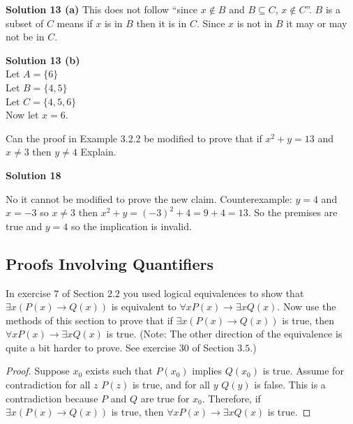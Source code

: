 \textbf{Solution 13 (a)}
This does not follow ``since $x \not\in B$ and $B \subseteq C$, $x \not\in C$''.
$B$ is a subset of $C$ means if $x$ is in $B$ then it is in $C$. 
Since $x$ is not in $B$ it may or may not be in $C$.

\textbf{Solution 13 (b)} \\
Let $A = \{6\}$ \\
Let $B = \{4, 5\}$ \\
Let $C = \{4, 5, 6\}$ \\
Now let $x = 6$. 

\begin{tcolorbox}[title=Problem 18, breakable]
    Can the proof in Example 3.2.2 be modified to
    prove that if $x^2 + y = 13$ and $x \not = 3$ then $y \not = 4$
    Explain.
\end{tcolorbox}

\textbf{Solution 18}

No it cannot be modified to prove the new claim. Counterexample: $y = 4$ and $x
    = -3$ so $x \not = 3$ then $x^2 + y = {(-3)}^2 + 4 = 9 + 4 = 13$. So the
premises are true and $y = 4$ so the implication is invalid.

\subsection{Proofs Involving Quantifiers}

\begin{tcolorbox}[title=Problem 1, breakable]
    In exercise $7$ of Section $2.2$ you used logical
    equivalences to show that $\exists{x}(P(x) \rightarrow Q(x))$ is
    equivalent to $\forall{x}P(x) \rightarrow \exists{x}Q(x)$. Now use the
    methods of this section to prove that if $\exists{x}(P(x) \rightarrow
        Q(x))$ is true, then $\forall{x}P(x) \rightarrow \exists{x}Q(x)$ is true. (Note:
    The other direction of the equivalence is quite a bit
    harder to prove. See exercise $30$ of Section $3.5$.)
\end{tcolorbox}

\begin{proof}
    Suppose $x_0$ exists such that $P(x_0)$ implies $Q(x_0)$ is true.
    Assume for contradiction for all $z$ $P(z)$ is true, and for all $y$ $Q(y)$ is false. 
    This is a contradiction because $P$ and $Q$ are true for $x_0$. Therefore, 
    if $\exists{x}(P(x) \rightarrow Q(x))$ is true, then 
    $\forall{x}P(x) \rightarrow \exists{x}Q(x)$ is true.
\end{proof}

